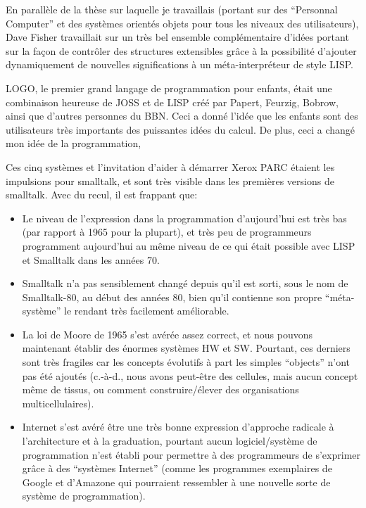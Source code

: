 \documentclass[a4paper,10pt,twoside]{book}
\begin{document}
En parall\`ele de la th\`ese sur laquelle je travaillais (portant sur des ``Personnal Computer'' et des syst\`emes orient\'es objets pour tous les niveaux des utilisateurs), Dave Fisher travaillait sur un tr\`es bel ensemble compl\'ementaire d'id\'ees portant sur la fa\c con de contr\^oler des structures extensibles gr\^ace \`a la possibilit\'e d'ajouter dynamiquement de nouvelles significations \`a un m\'eta-interpr\'eteur de style LISP.


LOGO, le premier grand langage de programmation  pour enfants, \'etait une combinaison heureuse de JOSS et de LISP cr\'e\'e par Papert, Feurzig, Bobrow, ainsi que d'autres personnes du BBN. Ceci a donn\'e l'id\'ee que les enfants sont des utilisateurs tr\`es importants des puissantes id\'ees du calcul. De plus, ceci a chang\'e mon id\'ee de la programmation,


Ces cinq syst\`emes et l'invitation d'aider \`a d\'emarrer  Xerox PARC \'etaient les impulsions pour smalltalk, et sont tr\`es visible dans les premi\`eres versions de smalltalk.
Avec du recul, il est frappant que:

\begin{itemize}
\item Le niveau de l'expression dans la programmation d'aujourd'hui est tr\`es bas (par rapport \`a 1965 pour la plupart), et tr\`es peu de programmeurs programment aujourd'hui au m\^eme  niveau de ce qui \'etait possible avec LISP et Smalltalk dans les ann\'ees 70.

\item  Smalltalk n'a pas sensiblement chang\'e depuis qu'il est sorti, sous le nom de Smalltalk-80, au d\'ebut des ann\'ees 80, bien qu'il contienne son propre ``m\'eta-syst\`eme'' le rendant  tr\`es facilement am\'eliorable.

\item  La loi de Moore de 1965 s'est av\'er\'ee assez correct, et nous pouvons maintenant \'etablir des \'enormes syst\`emes HW et SW. Pourtant, ces derniers sont tr\`es fragiles car les concepts \'evolutifs \`a part les simples ``objects'' n'ont pas \'et\'e ajout\'es (c.-\`a-d., nous avons peut-\^etre des cellules, mais aucun concept m\^eme de tissus, ou comment construire/\'elever des organisations multicellulaires).

\item Internet s'est av\'er\'e \^etre une tr\`es bonne expression d'approche radicale \`a l'architecture et \`a la graduation, pourtant aucun logiciel/syst\`eme de programmation n'est \'etabli pour permettre \`a des programmeurs de s'exprimer gr\^ace \`a des ``syst\`emes Internet'' (comme les programmes exemplaires  de Google et d'Amazone qui pourraient ressembler \`a une nouvelle sorte de syst\`eme de programmation).

\end{itemize}
 
\end{document}
